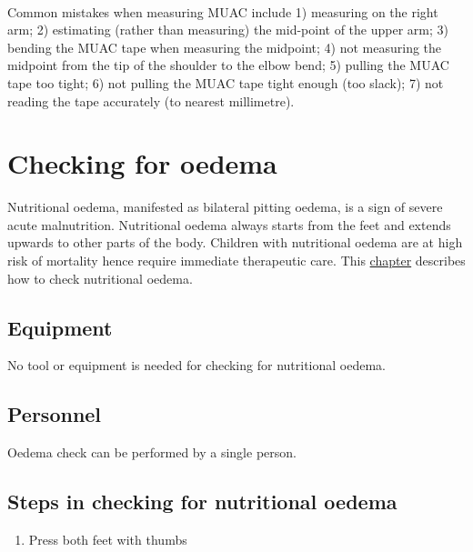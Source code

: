 \documentclass[12pt,]{book}
\providecommand{\tightlist}{%
  \setlength{\itemsep}{0pt}\setlength{\parskip}{0pt}}
\theoremstyle{definition}
\theoremstyle{definition}
\theoremstyle{definition}
\theoremstyle{remark}
\let\BeginKnitrBlock\begin \let\EndKnitrBlock\end
\begin{document}
~

\BeginKnitrBlock{rmdwarning}
Common mistakes when measuring MUAC include 1) measuring on the right
arm; 2) estimating (rather than measuring) the mid-point of the upper
arm; 3) bending the MUAC tape when measuring the midpoint; 4) not
measuring the midpoint from the tip of the shoulder to the elbow bend;
5) pulling the MUAC tape too tight; 6) not pulling the MUAC tape tight
enough (too slack); 7) not reading the tape accurately (to nearest
millimetre).
\EndKnitrBlock{rmdwarning}

\hypertarget{oedema}{%
\chapter{Checking for oedema}\label{oedema}}

Nutritional oedema, manifested as bilateral pitting oedema, is a sign of
severe acute malnutrition. Nutritional oedema always starts from the
feet and extends upwards to other parts of the body. Children with
nutritional oedema are at high risk of mortality hence require immediate
therapeutic care. This \protect\hyperlink{oedema}{chapter} describes how
to check nutritional oedema.

\hypertarget{equipment-3}{%
\section{Equipment}\label{equipment-3}}

No tool or equipment is needed for checking for nutritional oedema.

\hypertarget{personnel-3}{%
\section{Personnel}\label{personnel-3}}

Oedema check can be performed by a single person.

\hypertarget{steps-in-checking-for-nutritional-oedema}{%
\section{Steps in checking for nutritional
oedema}\label{steps-in-checking-for-nutritional-oedema}}

\begin{enumerate}
\def\labelenumi{\arabic{enumi}.}
\tightlist
\item
  Press both feet with thumbs
\end{enumerate}
\end{document}
